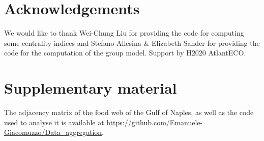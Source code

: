 \documentclass[twocolumn]{article}
\begin{document}
\section*{Acknowledgements}
	We would like to thank Wei-Chung Liu for providing the code for computing some centrality indices and Stefano Allesina \& Elizabeth Sander for providing the code for the  computation of the group model. Support by H2020 AtlantECO.
\section*{Supplementary material}
	The adjacency matrix of the food web of the Gulf of Naples, as well as the code used to analyse it is available at \url{https://github.com/Emanuele-Giacomuzzo/Data_aggregation}.
	
	
\end{document}
